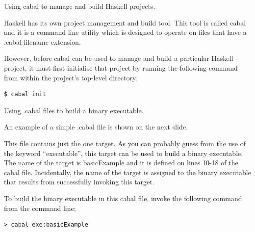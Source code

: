 
\begin{frame}[t, fragile]{Using cabal to manage and build Haskell projects.}

Haskell has its own project management and build tool. This tool is called
cabal and it is a command line utility which is designed to operate on
files that have a .cabal filename extension.

However, before cabal can be used to manage and build a particular Haskell
project, it must first initialise that project by running the following
command from within the project's top-level directory; \\

\begin{verbatim}
$ cabal init
\end{verbatim}

\end{frame}



\begin{frame}[t, fragile]{Using .cabal files to build a binary executable.}

An example of a simple .cabal file is shown on the next slide.

This file contains just the one target. As you can probably guess
from the use of the keyword ``executable'', this target can be
used to build a binary executable. The name of the target is
basicExample and it is defined on lines 10-18 of the cabal file.
Incidentally, the name of the target is assigned to the binary
executable that results from successfully invoking this target.

To build the binary executable in this cabal file, invoke the
following command from the command line;

\begin{verbatim}
> cabal exe:basicExample
\end{verbatim}

\end{frame}